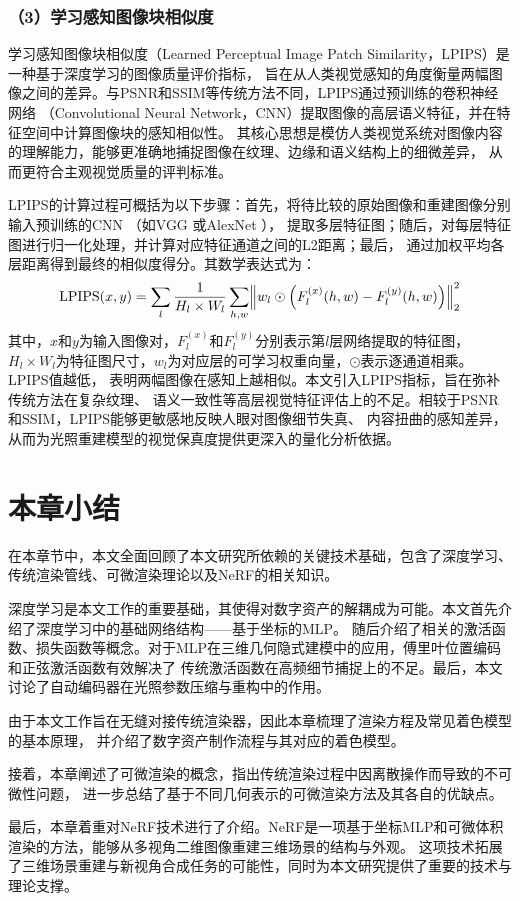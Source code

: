 \subsubsection*{（3）学习感知图像块相似度} 

学习感知图像块相似度（Learned Perceptual Image Patch Similarity，LPIPS）是一种基于深度学习的图像质量评价指标，
旨在从人类视觉感知的角度衡量两幅图像之间的差异。与PSNR和SSIM等传统方法不同，LPIPS通过预训练的卷积神经网络
（Convolutional Neural Network，CNN）提取图像的高层语义特征，并在特征空间中计算图像块的感知相似性。
其核心思想是模仿人类视觉系统对图像内容的理解能力，能够更准确地捕捉图像在纹理、边缘和语义结构上的细微差异，
从而更符合主观视觉质量的评判标准。

LPIPS的计算过程可概括为以下步骤：首先，将待比较的原始图像和重建图像分别输入预训练的CNN
（如VGG \cite{journals/corr/SimonyanZ14a}或AlexNet \cite{NIPS2012_c399862d}），
提取多层特征图；随后，对每层特征图进行归一化处理，并计算对应特征通道之间的L2距离；最后，
通过加权平均各层距离得到最终的相似度得分。其数学表达式为：
\begin{equation}\label{eq:lpips}
  \mathrm{LPIPS}(x,y)=
  \sum_{l}\frac{1}{H_{l}\times W_{l}}
  \sum_{h,w} \Bigl \Vert w_{l} \odot \Bigl(F_{l}^{(x)}(h,w)-F_{l}^{(y)}(h,w) \Bigr) \Bigr \Vert_{2}^{2}
\end{equation}
其中，$x$和$y$为输入图像对，$F_{l}^{(x)}$和$F_{l}^{(y)}$分别表示第$l$层网络提取的特征图，
$H_{l}\times W_{l}$为特征图尺寸，$w_{l}$为对应层的可学习权重向量，$\odot$表示逐通道相乘。LPIPS值越低，
表明两幅图像在感知上越相似。本文引入LPIPS指标，旨在弥补传统方法在复杂纹理、
语义一致性等高层视觉特征评估上的不足。相较于PSNR和SSIM，LPIPS能够更敏感地反映人眼对图像细节失真、
内容扭曲的感知差异，从而为光照重建模型的视觉保真度提供更深入的量化分析依据。

\section{本章小结}
在本章节中，本文全面回顾了本文研究所依赖的关键技术基础，包含了深度学习、传统渲染管线、可微渲染理论以及NeRF的相关知识。

深度学习是本文工作的重要基础，其使得对数字资产的解耦成为可能。本文首先介绍了深度学习中的基础网络结构——基于坐标的MLP。
随后介绍了相关的激活函数、损失函数等概念。对于MLP在三维几何隐式建模中的应用，傅里叶位置编码和正弦激活函数有效解决了
传统激活函数在高频细节捕捉上的不足。最后，本文讨论了自动编码器在光照参数压缩与重构中的作用。

由于本文工作旨在无缝对接传统渲染器，因此本章梳理了渲染方程及常见着色模型的基本原理，
并介绍了数字资产制作流程与其对应的着色模型。

接着，本章阐述了可微渲染的概念，指出传统渲染过程中因离散操作而导致的不可微性问题，
进一步总结了基于不同几何表示的可微渲染方法及其各自的优缺点。

最后，本章着重对NeRF技术进行了介绍。NeRF是一项基于坐标MLP和可微体积渲染的方法，能够从多视角二维图像重建三维场景的结构与外观。
这项技术拓展了三维场景重建与新视角合成任务的可能性，同时为本文研究提供了重要的技术与理论支撑。
